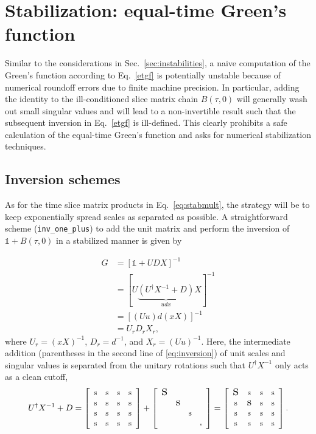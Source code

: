 \documentclass[submission, Phys]{SciPost}
\newcommand{\stiny}{\scalebox{0.5}{s}}
\newcommand{\ssmall}{\scalebox{0.9}{s}}
\newcommand{\smedium}{\scalebox{1.3}{s}}
\newcommand{\slarge}{\scalebox{1.7}{s}}
\newcommand{\U}{\left[
	\begin{array}{cccc}
		\ssmall & \ssmall & \ssmall & \ssmall \\
		\ssmall & \ssmall & \ssmall & \ssmall \\
		\ssmall & \ssmall & \ssmall & \ssmall \\
		\ssmall & \ssmall & \ssmall & \ssmall \\
	\end{array}
	\right]}
\newcommand{\D}{\left[
	\begin{array}{cccc}
		\slarge &  &  &  \\
		& \smedium &  &  \\
		&  & \ssmall &  \\
		&  &  & \stiny \\
	\end{array}
	\right]}
\begin{document}
\section{Stabilization: equal-time Green's function} \label{sec:etgf}

Similar to the considerations in Sec.~\ref{sec:instabilities}, a naive computation of the Green's function according to Eq.~\eqref{etgf} is potentially unstable because of numerical roundoff errors due to finite machine precision. In particular, adding the identity to the ill-conditioned slice matrix chain $B(\tau, 0)$ will generally wash out small singular values and will lead to a non-invertible result such that the subsequent inversion in Eq.~\eqref{etgf} is ill-defined. This clearly prohibits a safe calculation of the equal-time Green’s function and asks for numerical stabilization techniques.

\subsection{Inversion schemes}
As for the time slice matrix products in Eq.~\eqref{eq:stabmult}, the strategy will be to keep exponentially spread scales as separated as possible. A straightforward scheme \cite{Santos2003, Assaad2002a} (\texttt{inv\_one\_plus}) to add the unit matrix and perform the inversion of $\mathbb{1} + B(\tau, 0)$ in a stabilized manner is given by

\begin{align}
	G &= [\mathbb{1} + UDX]^{-1} \nonumber \\
	&= [U\underbrace{(U^\dagger X^{-1} + D)}_{udx}X]^{-1} \nonumber\\
	&= [(Uu)d(xX)]^{-1} \label{eq:inversion}\\
	&= U_r D_r X_r \nonumber,
\end{align}
where $U_r = (xX)^{-1}$, $D_r = d^{-1}$, and $X_r = (Uu)^{-1}$. Here, the intermediate addition (parentheses in the second line of \eqref{eq:inversion}) of unit scales and singular values is separated from the unitary rotations such that $U^\dagger X^{-1}$ only acts as a clean cutoff,
\begin{align}
U^\dagger X^{-1} + D = \U + \D = \left[
\begin{array}{cccc}
\slarge & \ssmall & \ssmall & \ssmall \\
\ssmall & \smedium & \ssmall & \ssmall \\
\ssmall & \ssmall & \ssmall & \ssmall \\
\ssmall & \ssmall & \ssmall & \ssmall \\
\end{array}
\right].
\end{align}
\end{document}
